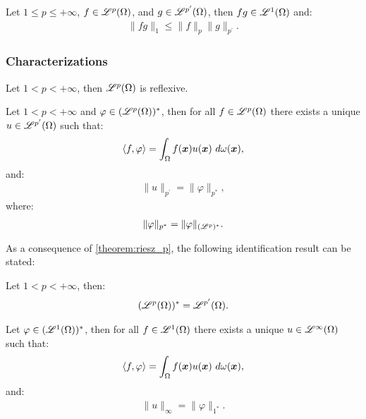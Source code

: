 \begin{theorem}
    Let $1 \leq p \leq +\infty$, $f \in \mathscr{L}^{p}(\Omega)$, and $g \in \mathscr{L}^{p^{\prime}}(\Omega)$, then $fg \in \mathscr{L}^{1}(\Omega)$ and:
    \begin{align}
        \lVert fg \rVert_1 \leq \lVert f \rVert_p \lVert g \rVert_{p^{\prime}}.
    \end{align}
\end{theorem}

\subsubsection{Characterizations}

\begin{theorem}
    Let $1 < p < +\infty$, then $\mathscr{L}^{p}(\Omega)$ is reflexive.
\end{theorem}

\begin{theorem} \label{theorem:riesz_p}
    Let $1 < p < +\infty$ and $\varphi \in (\mathscr{L}^{p}(\Omega))^*$, then for all $f \in \mathscr{L}^{p}(\Omega)$ there exists a unique $u \in \mathscr{L}^{p^{\prime}}(\Omega)$ such that:
    \begin{align}
        \langle f, \varphi \rangle = \int_{\Omega} f(\bm{x}) u(\bm{x}) ~ d \omega(\bm{x}),
    \end{align}
    and:
    \begin{align}
        \lVert u \rVert_{p^{\prime}} = \lVert \varphi \rVert_{p^*},
    \end{align}
    where:
    \begin{align}
        \lVert \varphi \rVert_{p^*} = \lVert \varphi \rVert_{(\mathscr{L}^{p})^*}.
    \end{align}
\end{theorem}

As a consequence of \cref{theorem:riesz_p}, the following identification result can be stated:

\begin{theorem}
    Let $1 < p < +\infty$, then:
    \begin{align}
        (\mathscr{L}^{p}(\Omega))^* = \mathscr{L}^{p^{\prime}}(\Omega).
    \end{align}
\end{theorem}

\begin{theorem}[Riesz representation theorem for $p = 1$] \label{theorem:riesz_1}
    Let $\varphi \in (\mathscr{L}^{1}(\Omega))^*$, then for all $f \in \mathscr{L}^{1}(\Omega)$ there exists a unique $u \in \mathscr{L}^{\infty}(\Omega)$ such that:
    \begin{align}
        \langle f, \varphi \rangle = \int_{\Omega} f(\bm{x}) u(\bm{x}) ~ d \omega(\bm{x}),
    \end{align}
    and:
    \begin{align}
        \lVert u \rVert_{\infty} = \lVert \varphi \rVert_{1^*}.
    \end{align}
\end{theorem}

